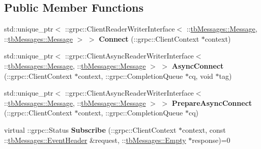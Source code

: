 \subsection*{Public Member Functions}
\begin{DoxyCompactItemize}
\item 
\mbox{\label{classtbMessages_1_1TarboraMessages_1_1StubInterface_accd46c0480e25da6379a654832c7f5e9}} 
std\+::unique\+\_\+ptr$<$ \+::grpc\+::\+Client\+Reader\+Writer\+Interface$<$ \+::\hyperlink{classtbMessages_1_1Message}{tb\+Messages\+::\+Message}, \+::\hyperlink{classtbMessages_1_1Message}{tb\+Messages\+::\+Message} $>$ $>$ {\bfseries Connect} (\+::grpc\+::\+Client\+Context $\ast$context)
\item 
\mbox{\label{classtbMessages_1_1TarboraMessages_1_1StubInterface_ade8020a90851167bae483f516ff9a885}} 
std\+::unique\+\_\+ptr$<$ \+::grpc\+::\+Client\+Async\+Reader\+Writer\+Interface$<$ \+::\hyperlink{classtbMessages_1_1Message}{tb\+Messages\+::\+Message}, \+::\hyperlink{classtbMessages_1_1Message}{tb\+Messages\+::\+Message} $>$ $>$ {\bfseries Async\+Connect} (\+::grpc\+::\+Client\+Context $\ast$context, \+::grpc\+::\+Completion\+Queue $\ast$cq, void $\ast$tag)
\item 
\mbox{\label{classtbMessages_1_1TarboraMessages_1_1StubInterface_aacc7f257ce6a76385657875f9e423e51}} 
std\+::unique\+\_\+ptr$<$ \+::grpc\+::\+Client\+Async\+Reader\+Writer\+Interface$<$ \+::\hyperlink{classtbMessages_1_1Message}{tb\+Messages\+::\+Message}, \+::\hyperlink{classtbMessages_1_1Message}{tb\+Messages\+::\+Message} $>$ $>$ {\bfseries Prepare\+Async\+Connect} (\+::grpc\+::\+Client\+Context $\ast$context, \+::grpc\+::\+Completion\+Queue $\ast$cq)
\item 
\mbox{\label{classtbMessages_1_1TarboraMessages_1_1StubInterface_a86ec652ec9cc5ebee69e01c1baf61c83}} 
virtual \+::grpc\+::\+Status {\bfseries Subscribe} (\+::grpc\+::\+Client\+Context $\ast$context, const \+::\hyperlink{classtbMessages_1_1EventHeader}{tb\+Messages\+::\+Event\+Header} \&request, \+::\hyperlink{classtbMessages_1_1Empty}{tb\+Messages\+::\+Empty} $\ast$response)=0
\item 
\mbox{\label{classtbMessages_1_1TarboraMessages_1_1StubInterface_a0700d711b79079c64b4b5c01f539769c}} 

\end{DoxyCompactItemize}
